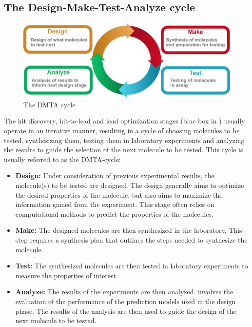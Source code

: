 \subsection{The Design-Make-Test-Analyze cycle}
\begin{figure}
      \centering
      \includegraphics[width=\textwidth]{figures/dmta_cycle.pdf}
      \caption{The DMTA cycle}
\end{figure}
The hit discovery, hit-to-lead and lead optimization stages (blue box in
) usually operate in an iterative manner, resulting in a cycle of
choosing molecules to be tested, synthesizing them, testing them in laboratory experiments and analyzing the
results to guide the selection of the next molecule to be tested. This cycle is usually referred to as the
\ac{DMTA}-cycle:
\begin{itemize}
      \item \textbf{Design:} Under consideration of previous experimental results, the molecule(s) to be tested
            are designed. The design generally aims to optimize the desired properties of the molecule, but
            also aims to maximize the information gained from the experiment. This stage often relies on
            computational methods to predict the properties of the molecules.
      \item \textbf{Make:} The designed molecules are then synthesized in the laboratory. This step requires
            a synthesis plan that outlines the steps needed to synthesize the molecule.
      \item \textbf{Test:} The synthesized molecules are then tested in laboratory experiments to
            measure the properties of interest.
      \item \textbf{Analyze:} The results of the experiments are then analyzed.
            involves the evaluation of the performance of the prediction models used in the design
            phase. The results of the analysis are then used to guide the design of the next molecule
            to be tested.
\end{itemize}

